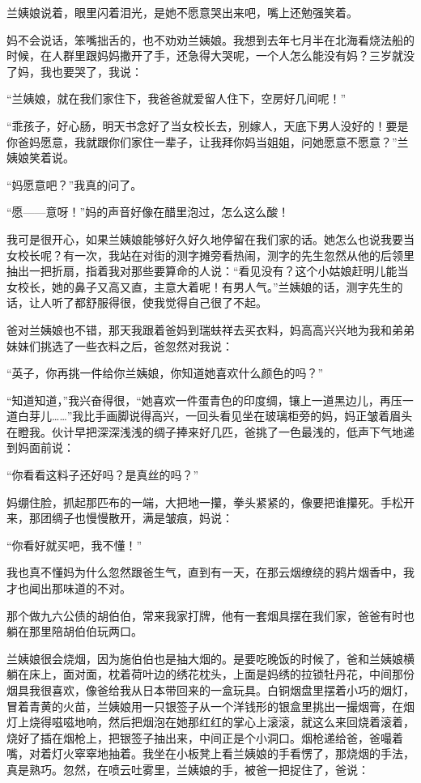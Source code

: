 \par 兰姨娘说着，眼里闪着泪光，是她不愿意哭出来吧，嘴上还勉强笑着。
\par 妈不会说话，笨嘴拙舌的，也不劝劝兰姨娘。我想到去年七月半在北海看烧法船的时候，在人群里跟妈妈撒开了手，还急得大哭呢，一个人怎么能没有妈？三岁就没了妈，我也要哭了，我说：
\par “兰姨娘，就在我们家住下，我爸爸就爱留人住下，空房好几间呢！”
\par “乖孩子，好心肠，明天书念好了当女校长去，别嫁人，天底下男人没好的！要是你爸妈愿意，我就跟你们家住一辈子，让我拜你妈当姐姐，问她愿意不愿意？”兰姨娘笑着说。
\par “妈愿意吧？”我真的问了。
\par “愿——意呀！”妈的声音好像在醋里泡过，怎么这么酸！
\par 我可是很开心，如果兰姨娘能够好久好久地停留在我们家的话。她怎么也说我要当女校长呢？有一次，我站在对街的测字摊旁看热闹，测字的先生忽然从他的后领里抽出一把折扇，指着我对那些要算命的人说：“看见没有？这个小姑娘赶明儿能当女校长，她的鼻子又高又直，主意大着呢！有男人气。”兰姨娘的话，测字先生的话，让人听了都舒服得很，使我觉得自己很了不起。
\par 爸对兰姨娘也不错，那天我跟着爸妈到瑞蚨祥去买衣料，妈高高兴兴地为我和弟弟妹妹们挑选了一些衣料之后，爸忽然对我说：
\par “英子，你再挑一件给你兰姨娘，你知道她喜欢什么颜色的吗？”
\par “知道知道，”我兴奋得很，“她喜欢一件蛋青色的印度绸，镶上一道黑边儿，再压一道白芽儿……”我比手画脚说得高兴，一回头看见坐在玻璃柜旁的妈，妈正皱着眉头在瞪我。伙计早把深深浅浅的绸子捧来好几匹，爸挑了一色最浅的，低声下气地递到妈面前说：
\par “你看看这料子还好吗？是真丝的吗？”
\par 妈绷住脸，抓起那匹布的一端，大把地一攥，拳头紧紧的，像要把谁攥死。手松开来，那团绸子也慢慢散开，满是皱痕，妈说：
\par “你看好就买吧，我不懂！”
\par 我也真不懂妈为什么忽然跟爸生气，直到有一天，在那云烟缭绕的鸦片烟香中，我才也闻出那味道的不对。
\par 那个做九六公债的胡伯伯，常来我家打牌，他有一套烟具摆在我们家，爸爸有时也躺在那里陪胡伯伯玩两口。
\par 兰姨娘很会烧烟，因为施伯伯也是抽大烟的。是要吃晚饭的时候了，爸和兰姨娘横躺在床上，面对面，枕着荷叶边的绣花枕头，上面是妈绣的拉锁牡丹花，中间那份烟具我很喜欢，像爸给我从日本带回来的一盒玩具。白铜烟盘里摆着小巧的烟灯，冒着青黄的火苗，兰姨娘用一只银签子从一个洋钱形的银盒里挑出一撮烟膏，在烟灯上烧得嗞嗞地响，然后把烟泡在她那红红的掌心上滚滚，就这么来回烧着滚着，烧好了插在烟枪上，把银签子抽出来，中间正是个小洞口。烟枪递给爸，爸嘬着嘴，对着灯火窣窣地抽着。我坐在小板凳上看兰姨娘的手看愣了，那烧烟的手法，真是熟巧。忽然，在喷云吐雾里，兰姨娘的手，被爸一把捉住了，爸说：
